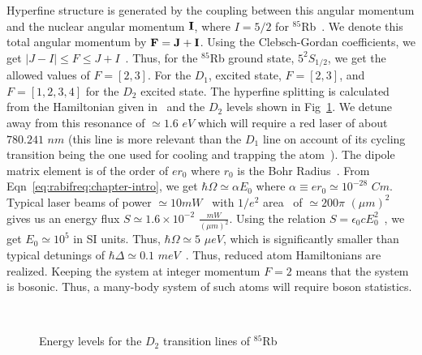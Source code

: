 Hyperfine structure is generated by the coupling between this angular momentum and the nuclear angular momentum ${\bf I}$, where $I=5/2$ for  $^{85}$Rb~\cite{rbdata}. We denote this total angular momentum by ${\bf F}={\bf J}+{\bf I}$. Using the Clebsch-Gordan coefficients, we get $ |J-I| \leq F \leq J+I$~\cite{sakurai}. Thus, for the $^{85}$Rb ground state, $5 ^2S_{1/2}$, we get the allowed values of $F=\left[ 2,3\right]$. For the $D_1$, excited state, $F=\left[2,3\right]$, and $F=\left[1,2,3,4 \right]$ for the $D_2$ excited state. The hyperfine splitting is calculated from the Hamiltonian given in~\cite{rbdata} and the $D_2$ levels shown in Fig~\ref{fig:rblevels}. We detune away from this resonance of $\simeq 1.6$ $eV$ which will require a red laser of about $780.241$ $nm$ (this line is more relevant than the $D_1$ line on account of its cycling transition being the one used for cooling and trapping the atom~\cite{rbdata}). The dipole matrix element is of the order of  $er_0$ where $r_0$ is the Bohr Radius~\cite{rbdata}. From Eqn~\ref{eq:rabifreq:chapter-intro}, we get $\hbar \Omega\simeq \alpha E_0$ where $\alpha\equiv e r_0 \simeq 10^{-28}$ $Cm$. Typical laser beams of power $\simeq 10 mW$~\cite{raizen} with $1/e^2$ area~\cite{encyclopedia:laser} of $\simeq 200\pi$ $(\mu m)^2$~\cite{raizen} gives us an energy flux $S\simeq 1.6 {\times} 10^{-2}$ $\frac{mW}{(\mu m)^2}$. Using the relation $S=\epsilon_0 c E^2_0$~\cite{jackson}, we get $E_0\simeq 10^5$ in SI units. Thus, $\hbar\Omega\simeq 5$ $\mu eV$, which is significantly smaller than typical detunings of $\hbar \Delta \simeq 0.1$ $meV$~\cite{steck}. Thus, reduced atom Hamiltonians are realized. Keeping the system at integer momentum $F=2$ means that the system is bosonic. Thus, a many-body system of such atoms will require boson statistics.

\begin{figure}
\hspace*{-0.1in}
\ 
\caption{Energy levels for the $D_2$ transition lines of  $^{85}$Rb }
\label{fig:rblevels}
\end{figure}

